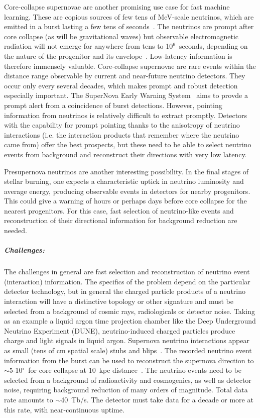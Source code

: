 Core-collapse supernovae are another promising use case for fast machine learning.  These are copious sources of few tens of MeV-scale neutrinos, which are emitted in a burst lasting a few tens of seconds~\cite{Scholberg:2012id,Mirizzi:2015eza}. The neutrinos are prompt after core collapse (as will be gravitational waves) but observable electromagnetic radiation will not emerge for anywhere from tens to 10$^6$~seconds, depending on the nature of the progenitor and its envelope~\cite{Kistler:2012as}.  Low-latency information is therefore immensely valuable.  Core-collapse supernovae are rare events within the distance range observable by current and near-future neutrino detectors.  They occur only every several decades, which makes prompt and robust detection especially important.  The SuperNova Early Warning System~\cite{Antonioli:2004zb,Kharusi:2020ovw} aims to provde a prompt alert from a coincidence of burst detections.  However, pointing information from neutrinos is relatively difficult to extract promptly.  Detectors with the capability for prompt pointing thanks to the anisotropy of neutrino interactions (i.e. the interaction products that remember where the neutrino came from) offer the best prospects, but these need to be able to select neutrino events from background and reconstruct their directions with very low latency.

Presupernova neutrinos are another interesting possibility. In the final stages of stellar burning, one expects a characteristic uptick in neutrino luminosity and average energy, producing observable events in detectors for nearby progenitors.  This could give a warning of hours or perhaps days before core collapse for the nearest progenitors. For this case, fast selection of neutrino-like events and reconstruction of their directional information for background reduction are needed.


\subparagraph*{Challenges:}

  The challenges in general are fast selection and reconstruction of neutrino event (interaction) information.  The specifics of the problem depend on the particular detector technology, but in general the charged particle products of a neutrino interaction will have a distinctive topology or other signature and must be selected from a background of cosmic rays, radiologicals or detector noise.
  Taking as an example a liquid argon time projection chamber like the Deep Underground Neutrino Experiment (DUNE), neutrino-induced charged particles produce charge and light signals in liquid argon.   Supernova neutrino interactions appear as small (tens of cm spatial scale) stubs and blips~\cite{Abi:2020lpk, Abi:2020evt}. The recorded neutrino event information from the burst can be used to reconstruct the supernova direction to $\sim$5-10$^\circ$~for core collapse at 10~kpc distance~\cite{ajpointingtalk,Abi:2020evt}. The neutrino events need to be selected from a background of radioactivity and cosmogenics, as well as detector noise, requiring background reduction of many orders of magnitude.  Total data rate amounts to $\sim$40~Tb/s.  The detector must take data for a decade or more at this rate, with near-continuous uptime. 
  
